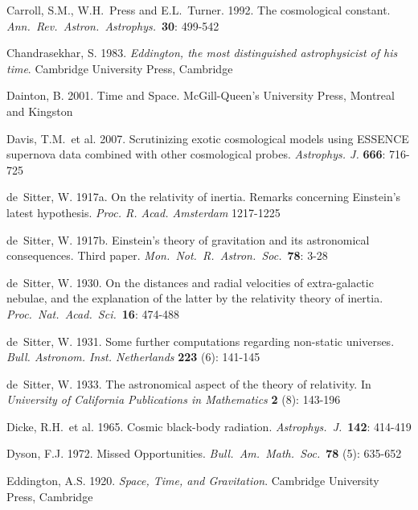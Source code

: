 \documentclass[12 pt]{article}
\begin{document}
\begin{thebibliography}{}
 Carroll, S.M., W.H.\ Press and E.L.\ Turner. 1992. The cosmological constant. \textit{Ann.\ Rev.\ Astron.\ Astrophys.}\ \textbf{30}: 499-542

 Chandrasekhar, S. 1983. \textit{Eddington, the most distinguished astrophysicist of his time}. Cambridge University Press, Cambridge

 Dainton, B. 2001. Time and Space. McGill-Queen’s University Press, Montreal and Kingston

 Davis, T.M.\ et al. 2007. Scrutinizing exotic cosmological models using ESSENCE supernova data combined with other cosmological probes. \textit{Astrophys. J.} \textbf{666}: 716-725

 de~Sitter, W. 1917a. On the relativity of inertia. Remarks concerning Einstein’s latest hypothesis. \textit{Proc. R. Acad. Amsterdam} 1217-1225

 de~Sitter, W. 1917b. Einstein’s theory of gravitation and its astronomical consequences. Third paper. \textit{Mon.\ Not.\ R.\ Astron.\ Soc.}\ \textbf{78}: 3-28

 de~Sitter, W. 1930. On the distances and radial velocities of extra-galactic nebulae, and the explanation of the latter by the relativity theory of inertia. \textit{Proc.\ Nat.\ Acad.\ Sci.}\ \textbf{16}: 474-488

 de~Sitter, W. 1931. Some further computations regarding non-static universes. \textit{Bull. Astronom. Inst. Netherlands} \textbf{223} (6): 141-145

 de~Sitter, W. 1933. The astronomical aspect of the theory of relativity. In \textit{University of California Publications in Mathematics} \textbf{2} (8): 143-196

 Dicke, R.H.\ et al. 1965. Cosmic black-body radiation.\textit{ Astrophys.\ J.}\ \textbf{142}: 414-419

 Dyson, F.J. 1972. Missed Opportunities. \textit{Bull.\ Am.\ Math.\ Soc.}\ \textbf{78} (5): 635-652

 Eddington, A.S. 1920. \textit{Space, Time, and Gravitation}. Cambridge University Press, Cambridge


\end{thebibliography}
\end{document}
